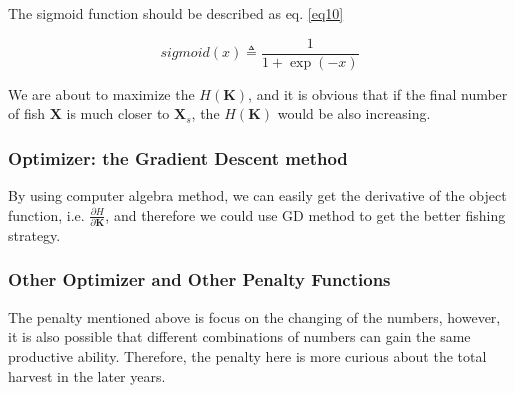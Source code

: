\documentclass{IEEEtran}
\begin{document}
The sigmoid function should be described as eq. \ref{eq10}

\begin{equation}
    \label{eq10}
    sigmoid(x) \triangleq \frac1{1 + \exp(-x)}
\end{equation}

We are about to maximize the $H(\bm K)$, and it is obvious that if the final number of fish $\bm X$ is much closer to $\bm X_s$, the $H(\bm K)$ would be also increasing.

\subsubsection{Optimizer: the Gradient Descent method}

By using computer algebra method, we can easily get the derivative of the object function, i.e. $\frac{\partial H}{\partial \bm K}$, and therefore we could use GD method to get the better fishing strategy.

%
%

\subsubsection{Other Optimizer and Other Penalty Functions}

The penalty mentioned above is focus on the changing of the numbers, however, it is also possible that different combinations of numbers can gain the same productive ability. Therefore, the penalty here is more curious about the total harvest in the later years.
\end{document}
